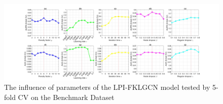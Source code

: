 \documentclass[fleqn,10pt]{wlscirep}
\begin{document}
\begin{figure}[ht]
\centering
\graphicspath{ {./images/} }
\includegraphics[width=\textwidth]{fig1.jpg}
\caption{The influence of parameters of the LPI-FKLGCN model tested by 5-fold CV on the Benchmark Dataset}
\label{fig:fig2-1}
\end{figure}

\end{document}
